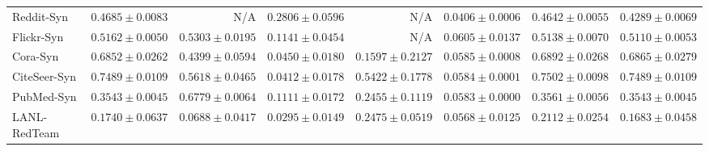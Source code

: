 \documentclass[applsci,article,submit,moreauthors,pdftex]{Definitions/mdpi}
\begin{document}
\begin{table}[H]
\begin{tabular*}{\textwidth}{@{\extracolsep{\fill}}lrrrrrrr}
Reddit-Syn & $\mathbf{0.4685 \pm 0.0083}$ & N/A & $0.2806 \pm 0.0596$ & N/A & $0.0406 \pm 0.0006$ & $0.4642 \pm 0.0055$ & $0.4289 \pm 0.0069$ \\
Flickr-Syn & $0.5162 \pm 0.0050$ & $\mathbf{0.5303 \pm 0.0195}$ & $0.1141 \pm 0.0454$ & N/A & $0.0605 \pm 0.0137$ & $0.5138 \pm 0.0070$ & $0.5110 \pm 0.0053$ \\
Cora-Syn & $0.6852 \pm 0.0262$ & $0.4399 \pm 0.0594$ & $0.0450 \pm 0.0180$ & $0.1597 \pm 0.2127$ & $0.0585 \pm 0.0008$ & $\mathbf{0.6892 \pm 0.0268}$ & $0.6865 \pm 0.0279$ \\
CiteSeer-Syn & $0.7489 \pm 0.0109$ & $0.5618 \pm 0.0465$ & $0.0412 \pm 0.0178$ & $0.5422 \pm 0.1778$ & $0.0584 \pm 0.0001$ & $\mathbf{0.7502 \pm 0.0098}$ & $0.7489 \pm 0.0109$ \\
PubMed-Syn & $0.3543 \pm 0.0045$ & $\mathbf{0.6779 \pm 0.0064}$ & $0.1111 \pm 0.0172$ & $0.2455 \pm 0.1119$ & $0.0583 \pm 0.0000$ & $0.3561 \pm 0.0056$ & $0.3543 \pm 0.0045$ \\
\midrule
LANL-RedTeam & $0.1740 \pm 0.0637$ & $0.0688 \pm 0.0417$ & $0.0295 \pm 0.0149$ & $\mathbf{0.2475 \pm 0.0519}$ & $0.0568 \pm 0.0125$ & $0.2112 \pm 0.0254$ & $0.1683 \pm 0.0458$ \\\bottomrule
\end{tabular*}
\end{table}
\end{document}
